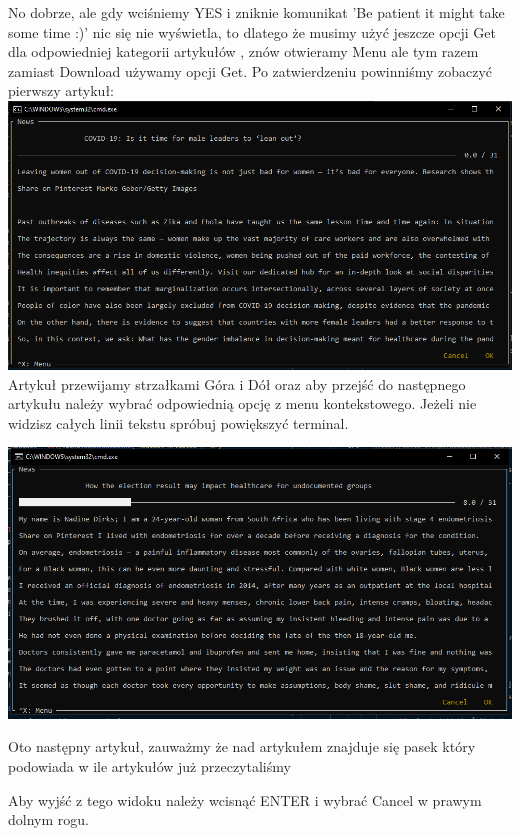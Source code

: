 \documentclass{article}
\begin{document}
\pagebreak
No dobrze, ale gdy wciśniemy YES i zniknie komunikat 'Be patient it might take some time :)' nic się nie wyświetla,
to dlatego że musimy użyć jeszcze opcji Get dla odpowiedniej kategorii artykułów , znów otwieramy Menu ale tym razem zamiast Download używamy opcji Get.
Po zatwierdzeniu powinniśmy zobaczyć pierwszy artykuł:\\

\includegraphics[width=\textwidth]{images/first_article.png}\\

Artykuł przewijamy strzałkami Góra i Dół oraz aby przejść do następnego artykułu należy wybrać odpowiednią opcję z menu kontekstowego. Jeżeli nie widzisz całych linii tekstu spróbuj powiększyć terminal.

\includegraphics[width=\textwidth]{images/next_article.png}

Oto następny artykuł, zauważmy że nad artykułem znajduje się pasek który podowiada w ile artykułów już przeczytaliśmy

Aby wyjść z tego widoku należy wcisnąć ENTER i wybrać Cancel w prawym dolnym rogu.
\end{document}
